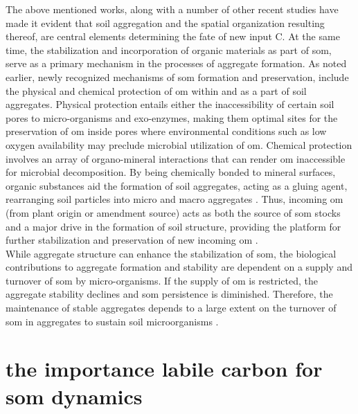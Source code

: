 	The above mentioned works, along with a  number of other recent studies have made it evident that soil aggregation and the spatial organization resulting thereof, are central elements determining the fate of new input C. At the same time, the stabilization and incorporation of organic materials as part of \gls{som}, serve as a primary mechanism in the processes of aggregate formation. As noted earlier, newly recognized mechanisms of \gls{som} formation and preservation, include the physical and chemical protection of \gls{om} within and as a part of soil aggregates. Physical protection entails either the inaccessibility of certain soil pores to micro-organisms and exo-enzymes, making them optimal sites for the preservation of \gls{om} inside pores where environmental conditions such as low oxygen availability may preclude microbial utilization of \gls{om}. Chemical protection involves an array of organo-mineral interactions that can render \gls{om} inaccessible for microbial decomposition. By being chemically bonded to mineral surfaces, organic substances aid the formation of soil aggregates, acting as a gluing agent, rearranging soil particles into micro and macro aggregates \citep{six2002}. Thus, incoming \gls{om} (from plant origin or amendment source) acts as both the source of \gls{som} stocks and a major drive in the formation of soil structure, providing the platform for further stabilization and preservation of new incoming \gls{om} \citep{mccarthy2008}.\\
	While aggregate structure can enhance the stabilization of \gls{som}, the biological contributions to aggregate formation and stability are dependent on a supply and turnover of \gls{som} by micro-organisms. If the supply of \gls{om} is restricted, the aggregate stability declines and \gls{som} persistence is diminished. Therefore, the maintenance of stable aggregates  depends to a large extent on the turnover of \gls{som} in aggregates to sustain soil microorganisms \citep{dungait2012, golchin1994}.


\section{the importance labile carbon for \gls{som} dynamics}

